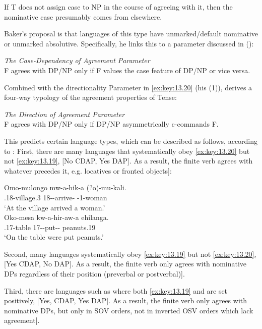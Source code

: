 \documentclass[output=paper]{langsci/langscibook}
\begin{document}
If T does not assign case to NP in the course of agreeing with it, then the
nominative case presumably comes from elsewhere.

Baker’s proposal is that languages of this type have unmarked/default
nominative or unmarked absolutive. Specifically, he links this to a parameter
discussed in \citeauthor{Baker2008} (\citeyear[155, (2)]{Baker2008}):

\ea%
    \label{ex:key:13.19}
    \emph{The Case-Dependency of Agreement Parameter}\\
    F agrees with DP/NP only if F values the case feature of DP/NP or vice
    versa.
\z

Combined with the directionality Parameter in \eqref{ex:key:13.20} (his (1)),
\citet{Baker2008} derives a four-way typology of the agreement properties of
Tense:

\ea\label{ex:key:13.20}
    \emph{The Direction of Agreement Parameter}\\
    F agrees with DP/NP only if DP/NP asymmetrically c-commands F.
\z

This predicts certain language types, which can be described as follows,
according to \citet{Baker2008}: First, there are many  languages that
systematically obey \eqref{ex:key:13.20} but not \eqref{ex:key:13.19}, [No CDAP, Yes
DAP]. As a result, the finite verb agrees with whatever precedes it, e.g.
locatives or fronted objects]:\newpage

\ea%
    \label{ex:key:13.21} \citep[158]{Baker2008}
	\ea
	\gll  Omo-mulongo mw-a-hik-a (?o)-mu-kali.\\
    \Loc.18-village.3 18\Sm-\Tns-arrive-\Fv{} \Aug{}-1-woman\\
	\glt     ‘At the village arrived a woman.’\\
    \ex
    \gll Oko-mesa kw-a-hir-aw-a ehilanga.\\
    \Loc.17-table 17\Sm-\Tns-put-\Pass{}-\Fv{} peanuts.19\\
    \glt ‘On the table were put peanuts.’
    \z
\z

Second, many  languages systematically obey \eqref{ex:key:13.19} but
not \eqref{ex:key:13.20}, [Yes CDAP, No DAP]. As a result, the finite verb only
agrees with nominative DPs regardless of their position (preverbal or
postverbal)].

Third, there are languages such as  where both \eqref{ex:key:13.19} and
 are set positively, [Yes, CDAP, Yes DAP]. As a result, the
finite verb only agrees with nominative DPs, but only in SOV orders, not in
inverted OSV orders which lack agreement].
\end{document}
